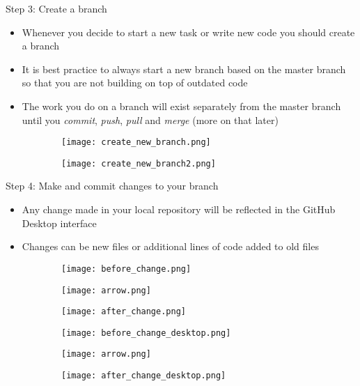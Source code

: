 \documentclass{beamer}
\begin{document}
\begin{frame}{Step 3: Create a branch}
\begin{itemize}
    \item Whenever you decide to start a new task or write new code you should create a  branch
    \item It is best practice to always start a new branch based on the master branch so that you are not building on top of outdated code
    \item The work you do on a branch will exist separately from the master branch until you \textit{commit}, \textit{push}, \textit{pull} and \textit{merge} (more on that later)
\end{itemize}
\begin{figure}
\centering
\begin{subfigure}{\textwidth}
  \centering
  \texttt{[image: create\_new\_branch.png]}
\end{subfigure}%
\hspace{1cm}
\begin{subfigure}{\textwidth}
  \centering
  \texttt{[image: create\_new\_branch2.png]}
\end{subfigure}
\end{figure}
\end{frame}

\begin{frame}{Step 4: Make and commit changes to your branch}
\begin{itemize}
    \item Any change made in your local repository will be reflected in the GitHub Desktop interface
    \item Changes can be new files or additional lines of code added to old files
\end{itemize}
\begin{figure}
\centering
\begin{subfigure}{\textwidth}
  \centering
  \texttt{[image: before\_change.png]}
\end{subfigure}%
\begin{subfigure}{\textwidth}
  \centering
  \texttt{[image: arrow.png]}
\end{subfigure}
\begin{subfigure}{\textwidth}
  \centering
  \texttt{[image: after\_change.png]}
\end{subfigure}
\end{figure}
\begin{figure}
\centering
\begin{subfigure}{\textwidth}
  \centering
  \texttt{[image: before\_change\_desktop.png]}
\end{subfigure}%
\begin{subfigure}{\textwidth}
  \centering
  \texttt{[image: arrow.png]}
\end{subfigure}
\begin{subfigure}{\textwidth}
  \centering
  \texttt{[image: after\_change\_desktop.png]}
\end{subfigure}
\end{figure}
\end{frame}
\end{document}
